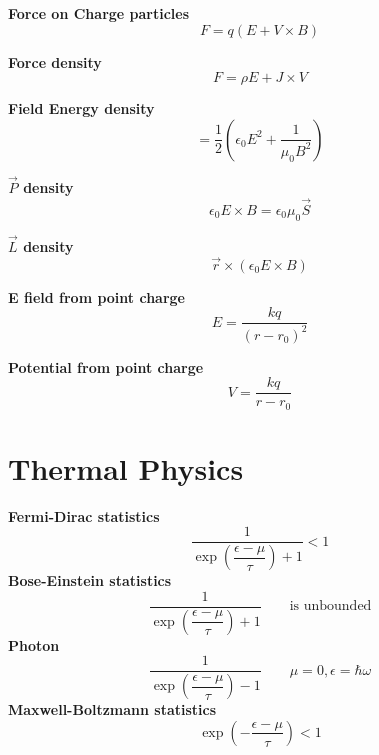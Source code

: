 \documentclass{article}
\begin{document}
{\bf{Force on Charge particles}}\begin{equation}F=q(E+V\times B)\end{equation}

{\bf{Force density}}\begin{equation}F=\rho E + J\times V\end{equation}

{\bf{Field Energy density}}\begin{equation}=\frac{1}{2} (\epsilon_0 E^2 + \frac{1}{\mu_0 B^2})\end{equation}

{\bf{$\vec{P}$ density}} \begin{equation}\epsilon_0 E \times B = \epsilon_0 \mu_0 \vec{S}\end{equation}

{\bf{$\vec{L}$ density}}\begin{equation}\vec{r}\times (\epsilon_0 E \times B)\end{equation}

{\bf{E field from point charge}}\begin{equation}E=\frac{kq}{(r-r_0)^2}\end{equation}

{\bf{Potential from point charge}}\begin{equation}V=\frac{kq}{r-r_0}\end{equation}










\section{Thermal Physics} %
{\bf Fermi-Dirac statistics}
\begin{equation}
  \dfrac{1}{\exp\left({\dfrac{\epsilon-\mu}{\tau}}\right)+1} < 1
\end{equation}
{\bf Bose-Einstein statistics}
\begin{equation}
  \dfrac{1}{\exp\left({\dfrac{\epsilon-\mu}{\tau}}\right)+1} \qquad \textrm{is unbounded}
\end{equation}
{\bf Photon}
\begin{equation}
  \dfrac{1}{\exp\left({\dfrac{\epsilon-\mu}{\tau}}\right)-1} \qquad \mu=0, \epsilon=\hbar\omega
\end{equation}
{\bf Maxwell-Boltzmann statistics}
\begin{equation}
  \exp{\left(-\frac{\epsilon-\mu}{\tau}\right)} < 1
\end{equation}
\end{document}
